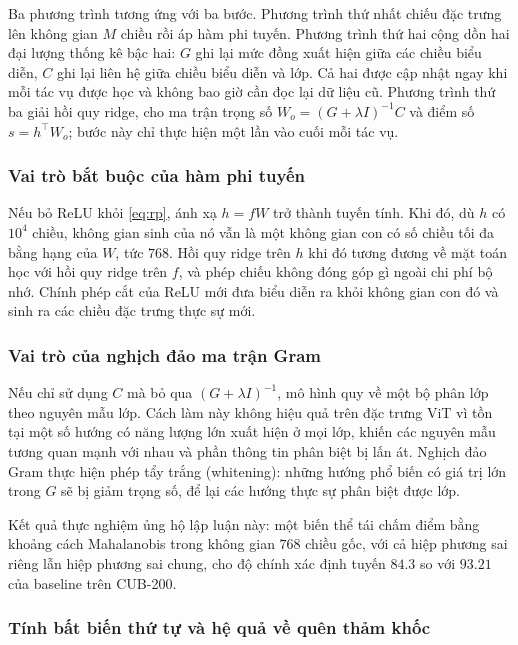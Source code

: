 \documentclass[11pt,a4paper]{article}
\begin{document}
Ba phương trình tương ứng với ba bước. Phương trình thứ nhất chiếu đặc trưng lên
không gian $M$ chiều rồi áp hàm phi tuyến. Phương trình thứ hai cộng dồn hai đại
lượng thống kê bậc hai: $G$ ghi lại mức đồng xuất hiện giữa các chiều biểu diễn,
$C$ ghi lại liên hệ giữa chiều biểu diễn và lớp. Cả hai được cập nhật ngay khi
mỗi tác vụ được học và không bao giờ cần đọc lại dữ liệu cũ. Phương trình thứ ba
giải hồi quy ridge, cho ma trận trọng số $W_o = (G + \lambda I)^{-1} C$ và điểm
số $s = h^{\top} W_o$; bước này chỉ thực hiện một lần vào cuối mỗi tác vụ.

\subsubsection{Vai trò bắt buộc của hàm phi tuyến}

Nếu bỏ ReLU khỏi \eqref{eq:rp}, ánh xạ $h = fW$ trở thành tuyến tính. Khi đó, dù
$h$ có $10^4$ chiều, không gian sinh của nó vẫn là một không gian con có số chiều
tối đa bằng hạng của $W$, tức $768$. Hồi quy ridge trên $h$ khi đó tương đương về
mặt toán học với hồi quy ridge trên $f$, và phép chiếu không đóng góp gì ngoài
chi phí bộ nhớ. Chính phép cắt của ReLU mới đưa biểu diễn ra khỏi không gian con
đó và sinh ra các chiều đặc trưng thực sự mới.

\subsubsection{Vai trò của nghịch đảo ma trận Gram}

Nếu chỉ sử dụng $C$ mà bỏ qua $(G + \lambda I)^{-1}$, mô hình quy về một bộ phân
lớp theo nguyên mẫu lớp. Cách làm này không hiệu quả trên đặc trưng ViT vì tồn
tại một số hướng có năng lượng lớn xuất hiện ở mọi lớp, khiến các nguyên mẫu
tương quan mạnh với nhau và phần thông tin phân biệt bị lấn át. Nghịch đảo Gram
thực hiện phép tẩy trắng (whitening): những hướng phổ biến có giá trị lớn trong
$G$ sẽ bị giảm trọng số, để lại các hướng thực sự phân biệt được lớp.

Kết quả thực nghiệm ủng hộ lập luận này: một biến thể tái chấm điểm bằng khoảng
cách Mahalanobis trong không gian $768$ chiều gốc, với cả hiệp phương sai riêng
lẫn hiệp phương sai chung, cho độ chính xác định tuyến $84.3$ so với $93.21$ của
baseline trên CUB-200.

\subsubsection{Tính bất biến thứ tự và hệ quả về quên thảm khốc}
\label{sec:order}
\end{document}
